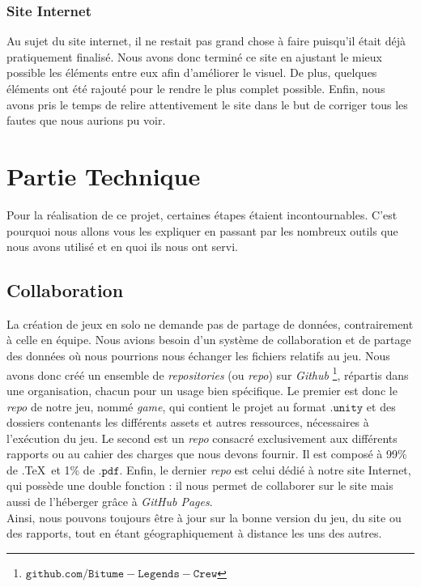 \documentclass[a4paper,12pt]{article}
\begin{document}
            \subsubsection{Site Internet}
            Au sujet du site internet, il ne restait pas grand chose à faire puisqu'il était déjà pratiquement finalisé. Nous avons donc terminé ce site en ajustant le mieux possible les éléments entre eux afin d'améliorer le visuel. De plus, quelques éléments ont été rajouté pour le rendre le plus complet possible. Enfin, nous avons pris le temps de relire attentivement le site  dans le but de corriger tous les fautes que nous aurions pu voir.
            
            

    \section{Partie Technique}
    Pour la réalisation de ce projet, certaines étapes étaient incontournables. C'est pourquoi nous allons vous les expliquer en passant par les nombreux outils que nous avons utilisé et en quoi ils nous ont servi.
        \subsection{Collaboration}
            La création de jeux en solo ne demande pas de partage de données, contrairement 
            à celle en équipe. Nous avions besoin d'un système de collaboration et de partage des données où nous 
            pourrions nous échanger les fichiers relatifs au jeu. 
            Nous avons donc créé un ensemble de \textit{repositories} (ou \textit{repo}) sur \textsl{Github}
            \footnote{\(\mathtt{github.com/Bitume-Legends-Crew}\)}, répartis dans une organisation,
            chacun pour un usage bien spécifique. Le premier est donc le \textit{repo} de
            notre jeu, nommé \textit{game}, qui contient le projet au format \(\mathtt{.unity}\)
            et des dossiers contenants les différents assets et autres ressources,
            nécessaires à l'exécution du jeu. 
            Le second est un \textit{repo} consacré exclusivement aux différents rapports ou au cahier des charges
            que nous devons fournir. Il est composé à 99\% de .\TeX\, et 1\% de \(\mathtt{.pdf}\).
            Enfin, le dernier \textit{repo} est celui dédié à notre site Internet, qui
            possède une double fonction : il nous permet de collaborer sur le site
            mais aussi de l'héberger grâce à \textsl{GitHub Pages}.\\
            \indent Ainsi, nous pouvons toujours être à jour sur la bonne version du jeu,
            du site ou des rapports, tout en étant géographiquement à distance les uns 
            des autres.
\end{document}
